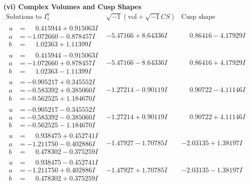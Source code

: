 \documentclass[1p]{elsarticle_modified}
\theoremstyle{definition}
\newcommand{\I}{\sqrt{-1}}
\begin{document}
\newpage\flushleft \textbf{(vi) Complex Volumes and Cusp Shapes}
$$\begin{array}{c|c|c}  
\text{Solutions to }I^u_{1}& \I (\text{vol} + \sqrt{-1}CS) & \text{Cusp shape}\\
 \hline 
\begin{aligned}
u &= \phantom{-}0.415944 + 0.915063 I \\
a &= -1.072660 - 0.878457 I \\
b &= \phantom{-}1.02363 + 1.11399 I\end{aligned}
 & -5.47166 + 8.64336 I & \phantom{-}0.86416 - 4.17929 I \\ \hline\begin{aligned}
u &= \phantom{-}0.415944 - 0.915063 I \\
a &= -1.072660 + 0.878457 I \\
b &= \phantom{-}1.02363 - 1.11399 I\end{aligned}
 & -5.47166 - 8.64336 I & \phantom{-}0.86416 + 4.17929 I \\ \hline\begin{aligned}
u &= -0.905217 + 0.345552 I \\
a &= -0.583392 + 0.385060 I \\
b &= -0.562525 + 1.184670 I\end{aligned}
 & -1.27214 - 0.90119 I & \phantom{-}0.90722 - 4.11146 I \\ \hline\begin{aligned}
u &= -0.905217 - 0.345552 I \\
a &= -0.583392 - 0.385060 I \\
b &= -0.562525 - 1.184670 I\end{aligned}
 & -1.27214 + 0.90119 I & \phantom{-}0.90722 + 4.11146 I \\ \hline\begin{aligned}
u &= \phantom{-}0.938475 + 0.452741 I \\
a &= -1.211750 - 0.402886 I \\
b &= \phantom{-}0.478302 - 0.375259 I\end{aligned}
 & -1.47927 - 1.70785 I & -2.03135 + 1.38197 I \\ \hline\begin{aligned}
u &= \phantom{-}0.938475 - 0.452741 I \\
a &= -1.211750 + 0.402886 I \\
b &= \phantom{-}0.478302 + 0.375259 I\end{aligned}
 & -1.47927 + 1.70785 I & -2.03135 - 1.38197 I \\ \hline\begin{aligned}

\end{aligned}
\end{array}$$
\end{document}
